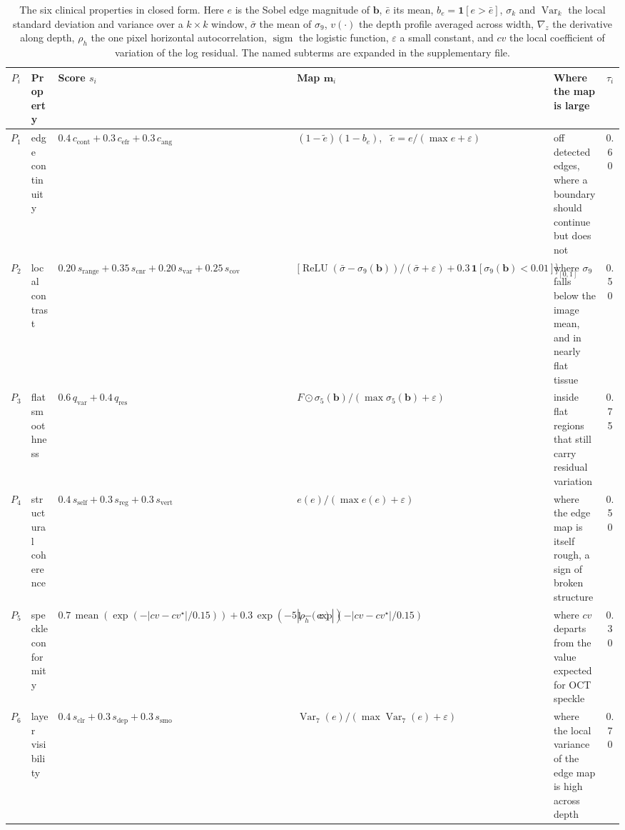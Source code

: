 \begin{table}[!tb]
\centering
\caption{The six clinical properties in closed form. Here $e$ is the Sobel edge magnitude of
$\mathbf{b}$, $\bar e$ its mean, $b_e = \mathbf{1}[e > \bar e]$, $\sigma_k$ and $\operatorname{Var}_k$
the local standard deviation and variance over a $k \times k$ window, $\bar\sigma$ the mean of
$\sigma_9$, $v(\cdot)$ the depth profile averaged across width, $\nabla_z$ the derivative along depth,
$\rho_h$ the one pixel horizontal autocorrelation, $\operatorname{sigm}$ the logistic function,
$\varepsilon$ a small constant, and $cv$ the local coefficient of variation of the log residual. The
named subterms are expanded in the supplementary file.}
\label{tab:predicates}
\setlength{\tabcolsep}{3pt}
\setlength{\aboverulesep}{0pt}
\setlength{\belowrulesep}{0pt}
\renewcommand{\arraystretch}{0.95}
\scriptsize
\begin{tabular}{clp{}p{}p{}c}
\toprule
$P_i$ & Property & Score $s_i$ & Map $\mathbf{m}_i$ & Where the map is large & $\tau_i$ \\
\midrule
$P_1$ & edge continuity &
$0.4\,c_{\text{cont}}+0.3\,c_{\text{efr}}+0.3\,c_{\text{ang}}$ &
$(1-\tilde e)(1-b_e)$, \ $\tilde e=e/(\max e+\varepsilon)$ &
off detected edges, where a boundary should continue but does not & 0.60 \\
$P_2$ & local contrast &
$0.20\,s_{\text{range}}+0.35\,s_{\text{cnr}}+0.20\,s_{\text{var}}+0.25\,s_{\text{cov}}$ &
$\big[\operatorname{ReLU}(\bar\sigma-\sigma_9(\mathbf{b}))/(\bar\sigma+\varepsilon)+0.3\,\mathbf{1}[\sigma_9(\mathbf{b})<0.01]\big]_{[0,1]}$ &
where $\sigma_9$ falls below the image mean, and in nearly flat tissue & 0.50 \\
$P_3$ & flat smoothness &
$0.6\,q_{\text{var}}+0.4\,q_{\text{res}}$ &
$F \odot \sigma_5(\mathbf{b})/(\max \sigma_5(\mathbf{b})+\varepsilon)$ &
inside flat regions that still carry residual variation & 0.75 \\
$P_4$ & structural coherence &
$0.4\,s_{\text{self}}+0.3\,s_{\text{reg}}+0.3\,s_{\text{vert}}$ &
$e(e)/(\max e(e)+\varepsilon)$ &
where the edge map is itself rough, a sign of broken structure & 0.50 \\
$P_5$ & speckle conformity &
$0.7\,\operatorname{mean}(\exp(-|cv-cv^\star|/0.15))+0.3\,\exp(-5|\rho_h(z)|)$ &
$1-\exp(-|cv-cv^\star|/0.15)$ &
where $cv$ departs from the value expected for OCT speckle & 0.30 \\
$P_6$ & layer visibility &
$0.4\,s_{\text{clr}}+0.3\,s_{\text{dep}}+0.3\,s_{\text{smo}}$ &
$\operatorname{Var}_7(e)/(\max \operatorname{Var}_7(e)+\varepsilon)$ &
where the local variance of the edge map is high across depth & 0.70 \\
\bottomrule
\end{tabular}
\end{table}

